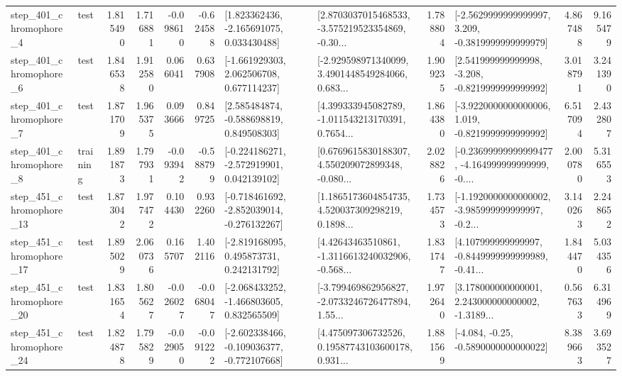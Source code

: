 \begin{tabular}{llrrrrllrlrr}
   step\_401\_chromophore\_4 &      test &      1.815490 &    1.716881 &     -0.098610 & -0.624588 &    [1.823362436, -2.165691075, 0.033430488] &  [2.8703037015468533, -3.575219523354869, -0.30... &       1.788804 &  [-2.5629999999999997, 3.209, -0.3819999999999979] &            4.867488 &          9.165479 \\
   step\_401\_chromophore\_6 &      test &      1.846538 &    1.912580 &      0.066041 &  0.637908 &    [-1.661929303, 2.062506708, 0.677114237] &  [-2.929598971340099, 3.4901448549284066, 0.683... &       1.909235 &   [2.541999999999998, -3.208, -0.8219999999999992] &            3.018791 &          3.241390 \\
   step\_401\_chromophore\_7 &      test &      1.871709 &    1.965375 &      0.093666 &  0.849725 &    [2.585484874, -0.588698819, 0.849508303] &  [4.399333945082789, -1.011543213170391, 0.7654... &       1.864380 &  [-3.9220000000000006, 1.019, -0.8219999999999992] &            6.517094 &          2.432807 \\
   step\_401\_chromophore\_8 &  training &      1.891873 &    1.797931 &     -0.093942 & -0.588799 &   [-0.224186271, -2.572919901, 0.042139102] &  [0.6769615830188307, 4.550209072899348, -0.080... &       2.028826 &  [-0.23699999999999477, -4.164999999999999, -0.... &            2.000780 &          5.316553 \\
  step\_451\_chromophore\_13 &      test &      1.873042 &    1.977472 &      0.104430 &  0.932260 &  [-0.718461692, -2.852039014, -0.276132267] &  [1.1865173604854735, 4.520037309298219, 0.1898... &       1.734573 &  [-1.1920000000000002, -3.985999999999997, -0.2... &            3.140263 &          2.248652 \\
  step\_451\_chromophore\_17 &      test &      1.895029 &    2.060736 &      0.165707 &  1.402116 &    [-2.819168095, 0.495873731, 0.242131792] &  [4.42643463510861, -1.3116613240032906, -0.568... &       1.831747 &  [4.107999999999997, -0.8449999999999989, -0.41... &            1.844470 &          5.034356 \\
  step\_451\_chromophore\_20 &      test &      1.831654 &    1.805627 &     -0.026027 & -0.068047 &   [-2.068433252, -1.466803605, 0.832565509] &  [-3.799469862956827, -2.0733246726477894, 1.55... &       1.972640 &  [3.178000000000001, 2.243000000000002, -1.3189... &            0.567633 &          6.314969 \\
  step\_451\_chromophore\_24 &      test &      1.824878 &    1.795829 &     -0.029050 & -0.091222 &  [-2.602338466, -0.109036377, -0.772107668] &  [4.475097306732526, 0.19587743103600178, 0.931... &       1.881569 &               [-4.084, -0.25, -0.5890000000000022] &            8.389663 &          3.693527 \\

\end{tabular}
